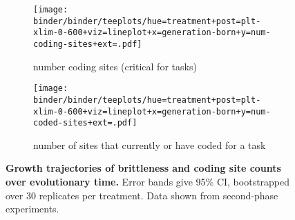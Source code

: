 \begin{figure}
    \centering
    \begin{subfigure}{\linewidth}
    \texttt{[image: binder/binder/teeplots/hue=treatment+post=plt-xlim-0-600+viz=lineplot+x=generation-born+y=num-coding-sites+ext=.pdf]}
    \caption{\footnotesize number coding sites (critical for tasks)}
    \label{fig:num-coding-sites:coding}
    \end{subfigure}

    \begin{subfigure}{\linewidth}
\texttt{[image: binder/binder/teeplots/hue=treatment+post=plt-xlim-0-600+viz=lineplot+x=generation-born+y=num-coded-sites+ext=.pdf]}
    \caption{\footnotesize number of sites that currently or have coded for a task}
    \label{fig:num-coding-sites:coded}
    \end{subfigure}
    \caption{
        \textbf{Growth trajectories of brittleness and coding site counts over evolutionary time.}
        \footnotesize
        Error bands give 95\% CI, bootstrapped over 30 replicates per treatment.
        Data shown from second-phase experiments.
    }
    \label{fig:num-coding-sites}
\end{figure}

